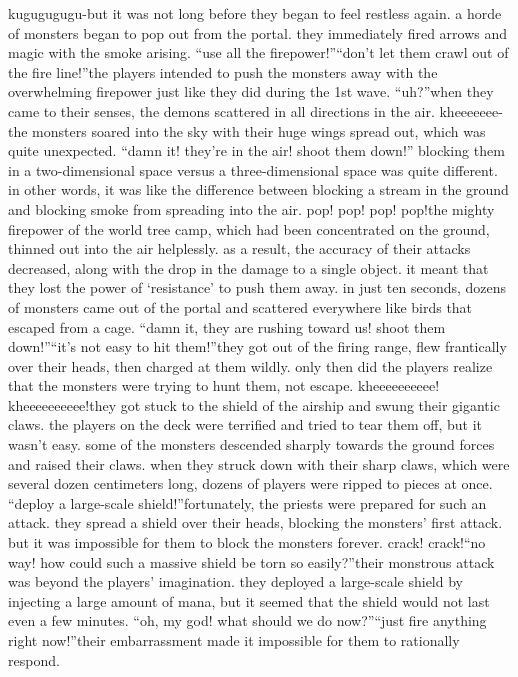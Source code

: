 kugugugugu-but it was not long before they began to feel restless again.
a horde of monsters began to pop out from the portal.
they immediately fired arrows and magic with the smoke arising.
“use all the firepower!”“don’t let them crawl out of the fire line!”the players intended to push the monsters away with the overwhelming firepower just like they did during the 1st wave.
“uh?”when they came to their senses, the demons scattered in all directions in the air.
kheeeeeee-the monsters soared into the sky with their huge wings spread out, which was quite unexpected.
“damn it! they’re in the air! shoot them down!”
blocking them in a two-dimensional space versus a three-dimensional space was quite different.
in other words, it was like the difference between blocking a stream in the ground and blocking smoke from spreading into the air.
pop! pop! pop! pop!the mighty firepower of the world tree camp, which had been concentrated on the ground, thinned out into the air helplessly.
 as a result, the accuracy of their attacks decreased, along with the drop in the damage to a single object.
 it meant that they lost the power of ‘resistance’ to push them away.
 in just ten seconds, dozens of monsters came out of the portal and scattered everywhere like birds that escaped from a cage.
“damn it, they are rushing toward us! shoot them down!”“it’s not easy to hit them!”they got out of the firing range, flew frantically over their heads, then charged at them wildly.
only then did the players realize that the monsters were trying to hunt them, not escape.
kheeeeeeeeee! kheeeeeeeeee!they got stuck to the shield of the airship and swung their gigantic claws.
 the players on the deck were terrified and tried to tear them off, but it wasn’t easy.
some of the monsters descended sharply towards the ground forces and raised their claws.
when they struck down with their sharp claws, which were several dozen centimeters long, dozens of players were ripped to pieces at once.
“deploy a large-scale shield!”fortunately, the priests were prepared for such an attack.
 they spread a shield over their heads, blocking the monsters’ first attack.
 but it was impossible for them to block the monsters forever.
crack! crack!“no way! how could such a massive shield be torn so easily?”their monstrous attack was beyond the players’ imagination.
 they deployed a large-scale shield by injecting a large amount of mana, but it seemed that the shield would not last even a few minutes.
“oh, my god! what should we do now?”“just fire anything right now!”their embarrassment made it impossible for them to rationally respond.
